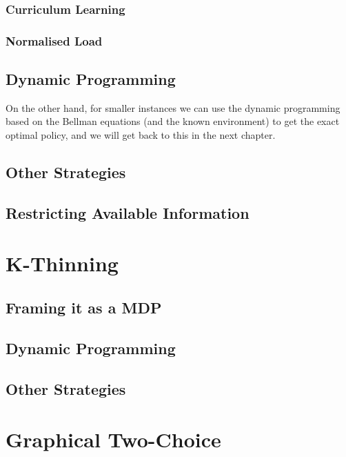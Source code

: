 \subsubsection{Curriculum Learning}


\subsubsection{Normalised Load}


\subsection{Dynamic Programming}


On the other hand, for smaller instances we can use the dynamic programming based on the Bellman equations (and the known environment) to get the exact optimal policy, and we will get back to this in the next chapter.

\subsection{Other Strategies}


\subsection{Restricting Available Information} \label{lesssharedstate}


\section{K-Thinning}


\subsection{Framing it as a MDP}


\subsection{Dynamic Programming}


\subsection{Other Strategies}


\section{Graphical Two-Choice}


